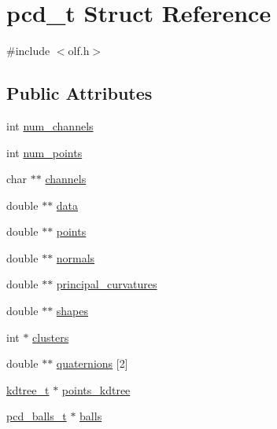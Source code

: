 \hypertarget{structpcd__t}{
\section{pcd\_\-t Struct Reference}
\label{structpcd__t}
}


{\ttfamily \#include $<$olf.h$>$}

\subsection*{Public Attributes}
\begin{DoxyCompactItemize}
\item 
int \hyperlink{structpcd__t_a85bedd808d9e6e291242d4d77fb2f969}{num\_\-channels}
\item 
int \hyperlink{structpcd__t_aec6b9d69c391d335a30664f7a0224b2a}{num\_\-points}
\item 
char $\ast$$\ast$ \hyperlink{structpcd__t_aadf41ef08c5e8925944bfe775fc39483}{channels}
\item 
double $\ast$$\ast$ \hyperlink{structpcd__t_aee8b2a44e95e26f441ed753c476d4a35}{data}
\item 
double $\ast$$\ast$ \hyperlink{structpcd__t_ab30ba806b8327b76fa83376f954b6e0a}{points}
\item 
double $\ast$$\ast$ \hyperlink{structpcd__t_ad47f9f4b1afe3dc4a64a24d98c73b48f}{normals}
\item 
double $\ast$$\ast$ \hyperlink{structpcd__t_a0df6df7fb46f615bb97f4fd7e0e4e353}{principal\_\-curvatures}
\item 
double $\ast$$\ast$ \hyperlink{structpcd__t_aa4de24fe6b02d793b103ddb02a949bd1}{shapes}
\item 
int $\ast$ \hyperlink{structpcd__t_aed7402283df4a6d4788f58941064e10a}{clusters}
\item 
double $\ast$$\ast$ \hyperlink{structpcd__t_ae095f52612909ad2dfd4bc7c1dd38cff}{quaternions} \mbox{[}2\mbox{]}
\item 
\hyperlink{structkdtree}{kdtree\_\-t} $\ast$ \hyperlink{structpcd__t_a0572db064564305853359b6ab93832a9}{points\_\-kdtree}
\item 
\hyperlink{structpcd__balls__t}{pcd\_\-balls\_\-t} $\ast$ \hyperlink{structpcd__t_acad9401b583e1d3cf16a74a702f83fba}{balls}
\end{DoxyCompactItemize}


